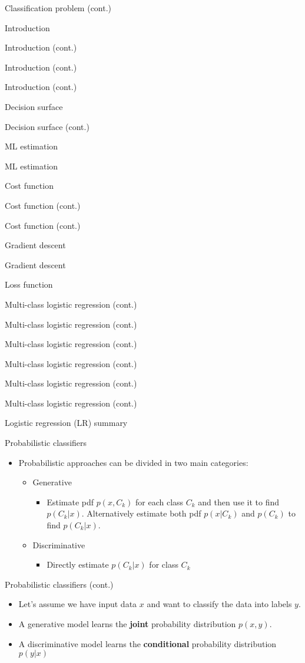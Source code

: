 \documentclass[serif, aspectratio=169]{beamer}
\begin{document}
\begin{frame}{Classification problem (cont.)}
\begin{itemize}
\begin{frame}{Introduction}
\begin{itemize}
\begin{frame}{Introduction (cont.)}
\begin{frame}{Introduction (cont.)}
\begin{frame}{Introduction (cont.)}
\begin{frame}{Decision surface}
\begin{itemize}
\begin{frame}{Decision surface (cont.)}
\begin{frame}{ML estimation}
\begin{frame}{ML estimation}
\begin{itemize}
\begin{frame}{Cost function}
\begin{frame}{Cost function (cont.)}
\begin{itemize}
\begin{itemize}
\begin{frame}{Cost function (cont.)}
\begin{frame}{Gradient descent}
\begin{frame}{Gradient descent}
\begin{frame}{Loss function}
\begin{frame}{Multi-class logistic regression (cont.)}
\begin{frame}{Multi-class logistic regression (cont.)}
\begin{frame}{Multi-class logistic regression (cont.)}
\begin{frame}{Multi-class logistic regression (cont.)}
\begin{frame}{Multi-class logistic regression (cont.)}
\begin{frame}{Multi-class logistic regression (cont.)}
\begin{frame}{Logistic regression (LR) summary}
\begin{itemize}
\begin{frame}{Probabilistic classifiers}
    \begin{itemize}
        \item Probabilistic approaches can be divided in two main categories:
            \begin{itemize}
                \item Generative
                    \begin{itemize}
                        \item Estimate pdf $p(x, C_k)$ for each class $C_k$ and then use it to find $p(C_k|x)$. Alternatively estimate both pdf $p(x|C_k)$ and $p(C_k)$ to find $p(C_k|x)$.
                    \end{itemize}
                \item Discriminative
                    \begin{itemize}
                        \item Directly estimate $p(C_k|x)$ for class $C_k$
                    \end{itemize}
            \end{itemize}
    \end{itemize}
\end{frame}
\begin{frame}{Probabilistic classifiers (cont.)}
    \begin{itemize}
        \item Let's assume we have input data $x$ and want to classify the data into labels $y$.
        \item A generative model learns the \textbf{joint} probability distribution $p(x,y)$.
            
        \item A discriminative model learns the \textbf{conditional} probability distribution $p(y|x)$
           

\end{itemize}
\end{frame}
\end{itemize}
\end{frame}
\end{frame}
\end{frame}
\end{frame}
\end{frame}
\end{frame}
\end{frame}
\end{frame}
\end{frame}
\end{frame}
\end{frame}
\end{itemize}
\end{itemize}
\end{frame}
\end{frame}
\end{itemize}
\end{frame}
\end{frame}
\end{frame}
\end{itemize}
\end{frame}
\end{frame}
\end{frame}
\end{frame}
\end{itemize}
\end{frame}
\end{itemize}
\end{frame}
\end{document}
